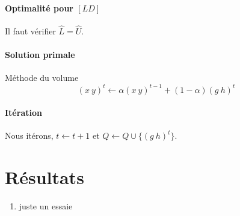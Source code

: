 \documentclass[12pt,a4paper]{article}
\begin{document}
 \paragraph{Optimalité pour $[LD]$} Il faut vérifier $\hat{L} = \hat{U}$.
 
 \paragraph{Solution primale} Méthode du volume
 $$(x~y)^t \leftarrow \alpha (x~y)^{t-1} + (1- \alpha)(g~h)^t$$
 
 \paragraph{Itération} Nous itérons, $t \leftarrow t+1$ et $Q \leftarrow Q \cup  \{(g~h)^t\}$.
 
 \section*{Résultats}
     
		 \begin{enumerate}
			 \item juste un essaie 
		 \end{enumerate}
 
\end{document}
